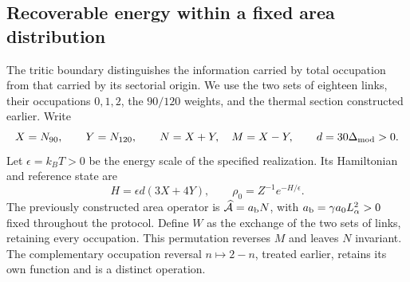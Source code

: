 \begingroup
\fontsize{10}{11.5}\selectfont
\setlength{\parskip}{1.5pt plus .5pt minus .5pt}
\setlength{\abovedisplayskip}{4.5pt plus 1pt minus 1pt}
\setlength{\belowdisplayskip}{4.5pt plus 1pt minus 1pt}
\setlength{\abovedisplayshortskip}{2pt plus 1pt}
\setlength{\belowdisplayshortskip}{2pt plus 1pt minus 1pt}
\subsection{Recoverable energy within a fixed area distribution}
\label{ins29:v:orientacion}

The tritic boundary distinguishes the information carried by total
occupation from that carried by its sectorial origin. We use the two sets
of eighteen links, their occupations \(0,1,2\), the \(90/120\) weights,
and the thermal section constructed earlier. Write
\[
 X=N_{90},\qquad Y=N_{120},\qquad N=X+Y,\quad M=X-Y,
 \qquad d=30\Delta_{\rm mod}>0.
\]
Let \(\epsilon=k_BT>0\) be the energy scale of the specified realization.
Its Hamiltonian and reference state are
\[
 H=\epsilon d(3X+4Y),\qquad
 \rho_0=Z^{-1}e^{-H/\epsilon}.
\]
The previously constructed area operator is
\(\widehat{\mathcal A}=a_{\rm b}N\), with
\(a_{\rm b}=\gamma a_0L_\alpha^2>0\) fixed throughout the protocol.
Define \(W\) as the exchange of the two sets of links, retaining every
occupation. This permutation reverses \(M\) and leaves \(N\) invariant.
The complementary occupation reversal \(n\mapsto2-n\), treated earlier,
retains its own function and is a distinct operation.


